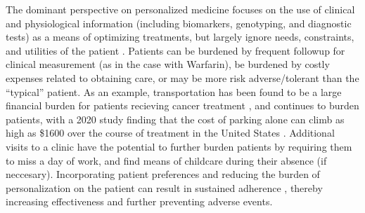 The dominant perspective on personalized medicine focuses on the use of clinical and physiological information (including biomarkers, genotyping, and diagnostic tests) as a means of optimizing treatments, but largely ignore needs, constraints, and utilities of the patient \cite{rogowski2015concepts, di2017personalized}. Patients can be burdened by frequent followup for clinical measurement (as in the case with Warfarin), be burdened by costly expenses related to obtaining care, or may be more risk adverse/tolerant than the ``typical'' patient. As an example, transportation has been found to be a large financial burden for patients recieving cancer treatment \cite{houts1984nonmedical}, and continues to burden patients, with a 2020 study finding that the cost of parking alone can climb as high as \$1600 over the course of treatment in the United States \cite{lee2020assessment}.  Additional visits to a clinic have the potential to further burden patients by requiring them to miss a day of work, and find means of childcare during their absence (if neccesary). Incorporating patient preferences and reducing the burden of personalization on the patient can result in sustained adherence \cite{elliott2008understanding}, thereby increasing effectiveness and further preventing adverse events.



